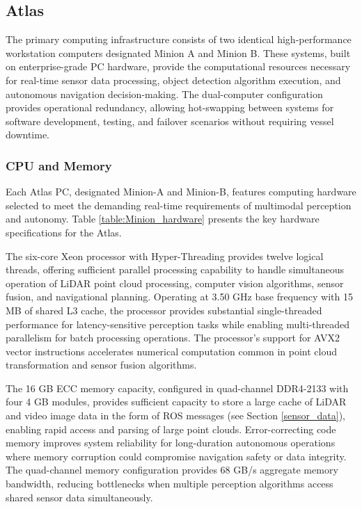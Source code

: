 \subsection{Atlas} \label{atlas}

The primary computing infrastructure consists of two identical high-performance workstation computers designated Minion A and Minion B.
These systems, built on enterprise-grade PC hardware, provide the computational resources necessary for real-time sensor data processing, object detection algorithm execution, and autonomous navigation decision-making.
The dual-computer configuration provides operational redundancy, allowing hot-swapping between systems for software development, testing, and failover scenarios without requiring vessel downtime.

\subsubsection{CPU and Memory}
Each Atlas PC, designated Minion-A and Minion-B, features computing hardware selected to meet the demanding real-time requirements of multimodal perception and autonomy.
Table \ref{table:Minion_hardware} presents the key hardware specifications for the Atlas.%

The six-core Xeon processor with Hyper-Threading provides twelve logical threads, offering sufficient parallel processing capability to handle simultaneous operation of LiDAR point cloud processing, computer vision algorithms, sensor fusion, and navigational planning.
Operating at 3.50 GHz base frequency with 15 MB of shared L3 cache, the processor provides substantial single-threaded performance for latency-sensitive perception tasks while enabling multi-threaded parallelism for batch processing operations.
The processor's support for AVX2 vector instructions accelerates numerical computation common in point cloud transformation and sensor fusion algorithms.

The 16 GB ECC memory capacity, configured in quad-channel DDR4-2133 with four 4 GB modules, provides sufficient capacity to store a large cache of LiDAR and video image data in the form of \ac{ROS} messages (see Section \ref{sensor_data}), enabling rapid access and parsing of large point clouds.%
Error-correcting code memory improves system reliability for long-duration autonomous operations where memory corruption could compromise navigation safety or data integrity.
The quad-channel memory configuration provides 68 GB/s aggregate memory bandwidth, reducing bottlenecks when multiple perception algorithms access shared sensor data simultaneously.


